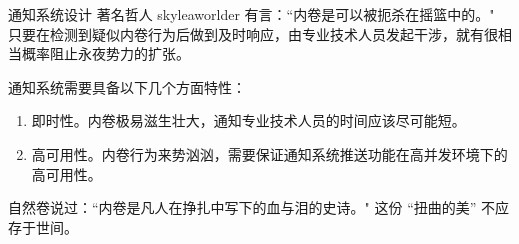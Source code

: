     \begin{frame}{通知系统设计}
        著名哲人 skyleaworlder 有言：“内卷是可以被扼杀在摇篮中的。"\cite{involution} 只要在检测到疑似内卷行为后做到及时响应，由专业技术人员发起干涉，就有很相当概率阻止永夜势力的扩张。

        通知系统需要具备以下几个方面特性：
        \begin{enumerate}
            \item 即时性。内卷极易滋生壮大，通知专业技术人员的时间应该尽可能短。
            \item 高可用性。内卷行为来势汹汹，需要保证通知系统推送功能在高并发环境下的高可用性。
        \end{enumerate}

        自然卷说过：“内卷是凡人在挣扎中写下的血与泪的史诗。"\cite{undergrads_inv} 这份 “扭曲的美” 不应存于世间。
    \end{frame}
